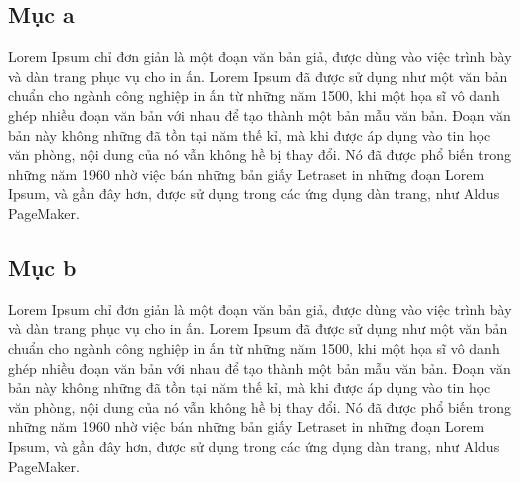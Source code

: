 \subsection{Mục a}
Lorem Ipsum chỉ đơn giản là một đoạn văn bản giả, được dùng vào việc trình bày và dàn trang phục vụ cho in ấn. Lorem Ipsum đã được sử dụng như một văn bản chuẩn cho ngành công nghiệp in ấn từ những năm 1500, khi một họa sĩ vô danh ghép nhiều đoạn văn bản với nhau để tạo thành một bản mẫu văn bản. Đoạn văn bản này không những đã tồn tại năm thế kỉ, mà khi được áp dụng vào tin học văn phòng, nội dung của nó vẫn không hề bị thay đổi. Nó đã được phổ biến trong những năm 1960 nhờ việc bán những bản giấy Letraset in những đoạn Lorem Ipsum, và gần đây hơn, được sử dụng trong các ứng dụng dàn trang, như Aldus PageMaker.

\subsection{Mục b}
Lorem Ipsum chỉ đơn giản là một đoạn văn bản giả, được dùng vào việc trình bày và dàn trang phục vụ cho in ấn. Lorem Ipsum đã được sử dụng như một văn bản chuẩn cho ngành công nghiệp in ấn từ những năm 1500, khi một họa sĩ vô danh ghép nhiều đoạn văn bản với nhau để tạo thành một bản mẫu văn bản. Đoạn văn bản này không những đã tồn tại năm thế kỉ, mà khi được áp dụng vào tin học văn phòng, nội dung của nó vẫn không hề bị thay đổi. Nó đã được phổ biến trong những năm 1960 nhờ việc bán những bản giấy Letraset in những đoạn Lorem Ipsum, và gần đây hơn, được sử dụng trong các ứng dụng dàn trang, như Aldus PageMaker.